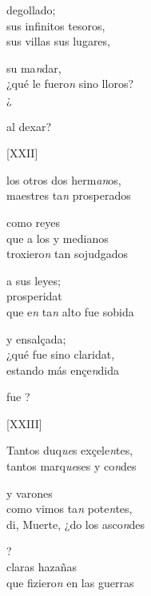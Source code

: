 \documentclass[11pt,a4paper,twoside]{article}
\begin{document}
{degollado;\\
sus infinitos tesoros,\\
sus villas  sus lugares,

su ma\textit{n}dar,\\
¿qué le fuero\textit{n} sino lloros?\\
¿

al dexar?
\pend

\begin{center}
	[XXII]
\end{center}
\pstart
{} los otros dos herm\textit{an}os,\\
maestres ta\textit{n} prosperados

como reyes\\
que a los  y medianos\\
troxiero\textit{n} tan sojudgados

a sus leyes;\\
 prosperidat\\
que e\textit{n} ta\textit{n} alto fue sobida

y ensalçada;\\
¿qué fue sino claridat,\\
 estando más ençe\textit{n}dida

fue ?
\pend

\begin{center}
	[XXIII]
\end{center}
\pstart
Tantos duq\textit{ue}s exçele\textit{n}tes,\\ tantos marq\textit{ue}ses y co\textit{n}des

y varones\\
como vimos ta\textit{n} pote\textit{n}tes,\\
di, Muerte, ¿do los asco\textit{n}des

?\\
 claras hazañas\\
que fiziero\textit{n} en las guerras

}
\end{document}
